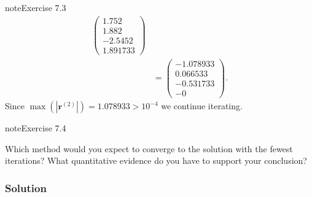 \documentclass[letterpaper,10pt,english]{jupyterBook}
\begin{document}
\begin{sphinxadmonition}{note}{Exercise 7.3}
\begin{align*}
    \begin{pmatrix} 1.752 \\ 1.882 \\ -2.5452 \\ 1.891733 \end{pmatrix} \\
    &= \begin{pmatrix} -1.078933 \\ 0.066533 \\ -0.531733 \\ -0\end{pmatrix}.
\end{align*}
\sphinxAtStartPar
Since \(\max(| \mathbf{r}^{(2)} |) = 1.078933 > 10^{-4}\) we continue iterating.
\end{sphinxadmonition}

\begin{sphinxadmonition}{note}{Exercise 7.4}

\sphinxAtStartPar
Which method would you expect to converge to the solution with the fewest iterations? What quantitative evidence do you have to support your conclusion?
\subsubsection*{Solution}


\end{sphinxadmonition}
\end{document}
